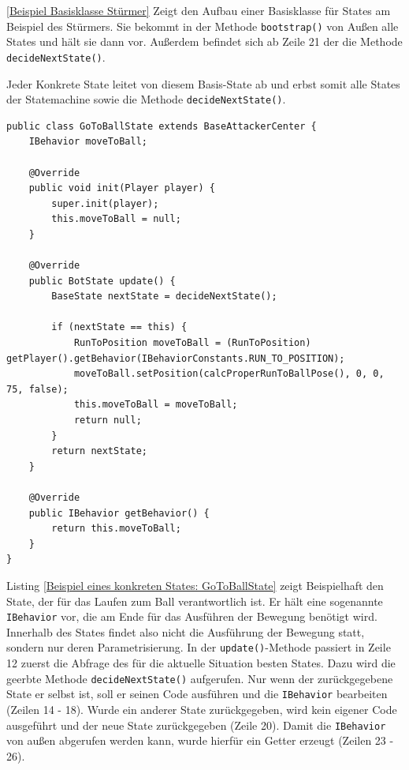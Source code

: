 \documentclass[fontsize=12pt,a4paper,final]{scrartcl}[2003/01/01]
\begin{document}
\ref{Beispiel Basisklasse Stürmer} Zeigt den Aufbau einer Basisklasse für States am Beispiel des Stürmers. Sie bekommt in der Methode \lstinline$bootstrap()$ von Außen alle States und hält sie dann vor. Außerdem befindet sich ab Zeile 21 der die Methode \lstinline$decideNextState()$.

Jeder Konkrete State leitet von diesem Basis-State ab und erbst somit alle States der Statemachine sowie die Methode \lstinline$decideNextState()$.
\\

\begin{lstlisting}[caption=Beispiel eines konkreten States: GoToBallState, captionpos=b, label=Beispiel eines konkreten States: GoToBallState]
public class GoToBallState extends BaseAttackerCenter {
    IBehavior moveToBall;

    @Override
    public void init(Player player) {
        super.init(player);
        this.moveToBall = null;
    }

    @Override
    public BotState update() {
        BaseState nextState = decideNextState();

        if (nextState == this) {
            RunToPosition moveToBall = (RunToPosition) getPlayer().getBehavior(IBehaviorConstants.RUN_TO_POSITION);
            moveToBall.setPosition(calcProperRunToBallPose(), 0, 0, 75, false);
            this.moveToBall = moveToBall;
            return null;
        }
        return nextState;
    }

    @Override
    public IBehavior getBehavior() {
        return this.moveToBall;
    }
}
\end{lstlisting}

Listing \ref{Beispiel eines konkreten States: GoToBallState} zeigt Beispielhaft den State, der für das Laufen zum Ball verantwortlich ist. Er hält eine sogenannte \lstinline$IBehavior$ vor, die am Ende für das Ausführen der Bewegung benötigt wird. Innerhalb des States findet also nicht die Ausführung der Bewegung statt, sondern nur deren Parametrisierung. In der \lstinline$update()$-Methode passiert in Zeile 12 zuerst die Abfrage des für die aktuelle Situation besten States. Dazu wird die geerbte Methode \lstinline$decideNextState()$ aufgerufen. Nur wenn der zurückgegebene State er selbst ist, soll er seinen Code ausführen und die \lstinline$IBehavior$ bearbeiten (Zeilen 14 - 18). Wurde ein anderer State zurückgegeben, wird kein eigener Code ausgeführt und der neue State zurückgegeben (Zeile 20). Damit die \lstinline$IBehavior$ von außen abgerufen werden kann, wurde hierfür ein Getter erzeugt (Zeilen 23 - 26).
\end{document}
